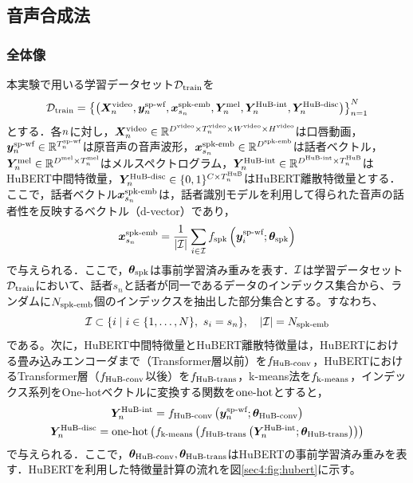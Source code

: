 \subsection{音声合成法}
\subsubsection{全体像}
本実験で用いる学習データセット$\mathcal{D}_{\text{train}}$を
\begin{equation}
    \mathcal{D}_{\text{train}} = \left\{\left(\bm{X}^{\text{video}}_{n}, \bm{y}^{\text{sp-wf}}_{n}, \bm{x}^{\text{spk-emb}}_{s_{n}}, \bm{Y}^{\text{mel}}_{n}, \bm{Y}^{\text{HuB-int}}_{n}, \bm{Y}^{\text{HuB-disc}}_{n}\right)\right\}_{n = 1}^{N}
\end{equation}
とする．各$n$に対し，$\bm{X}^{\text{video}}_{n} \in \mathbb{R}^{D^{\text{video}} \times T^{\text{video}}_{n} \times W^{\text{video}} \times H^{\text{video}}}$は口唇動画， $\bm{y}^{\text{sp-wf}}_{n} \in \mathbb{R}^{T^{\text{sp-wf}}_{n}}$は原音声の音声波形，$\bm{x}^{\text{spk-emb}}_{s_{n}} \in \mathbb{R}^{D^{\text{spk-emb}}}$は話者ベクトル，$\bm{Y}^{\text{mel}}_{n} \in \mathbb{R}^{D^{\text{mel}} \times T^{\text{mel}}_{n}}$はメルスペクトログラム，$\bm{Y}^{\text{HuB-int}}_{n} \in \mathbb{R}^{D^{\text{HuB-int}} \times T^{\text{HuB}}_{n}}$はHuBERT中間特徴量，$\bm{Y}^{\text{HuB-disc}}_{n} \in \{0, 1\}^{C \times T^{\text{HuB}}_{n}}$はHuBERT離散特徴量とする．ここで，話者ベクトル$\bm{x}^{\text{spk-emb}}_{s_{n}}$は，話者識別モデル\cite{wan2018generalized}を利用して得られた音声の話者性を反映するベクトル（d-vector）であり，
\begin{equation}
    \bm{x}^{\text{spk-emb}}_{s_{n}} = \frac{1}{|\mathcal{I}|} \sum_{i \in \mathcal{I}} f_{\text{spk}}\left(\bm{y}^{\text{sp-wf}}_{i}; \bm{\theta}_{\text{spk}}\right)
\end{equation}
で与えられる．ここで，$\bm{\theta}_{\text{spk}}$は事前学習済み重みを表す．$\mathcal{I}$は学習データセット$\mathcal{D}_{\text{train}}$において、話者$s_{n}$と話者が同一であるデータのインデックス集合から、ランダムに$N_{\text{spk-emb}}$個のインデックスを抽出した部分集合とする。すなわち、
\begin{equation}
    \mathcal{I} \subset \{i \mid i \in \{1, \ldots, N\}, ~ s_{i} = s_{n}\}, \quad |\mathcal{I}| = N_{\text{spk-emb}}
\end{equation}
である。次に，HuBERT中間特徴量とHuBERT離散特徴量は，HuBERTにおける畳み込みエンコーダまで（Transformer層以前）を$f_{\text{HuB-conv}}$，HuBERTにおけるTransformer層（$f_{\text{HuB-conv}}$以後）を$f_{\text{HuB-trans}}$，k-means法を$f_{\text{k-means}}$，インデックス系列をOne-hotベクトルに変換する関数を$\text{one-hot}$とすると，
\begin{gather}
    \bm{Y}^{\text{HuB-int}}_{n} = f_{\text{HuB-conv}}\left(\bm{y}^{\text{sp-wf}}_{n}; \bm{\theta}_{\text{HuB-conv}}\right) \\
    \bm{Y}^{\text{HuB-disc}}_{n} = \text{one-hot}\left(f_{\text{k-means}}\left(f_{\text{HuB-trans}}\left(\bm{Y}^{\text{HuB-int}}_{n}; \bm{\theta}_{\text{HuB-trans}}\right)\right)\right)
\end{gather}
で与えられる．ここで，$\bm{\theta}_{\text{HuB-conv}}, \bm{\theta}_{\text{HuB-trans}}$はHuBERTの事前学習済み重みを表す．HuBERTを利用した特徴量計算の流れを図\ref{sec4:fig:hubert}に示す。

